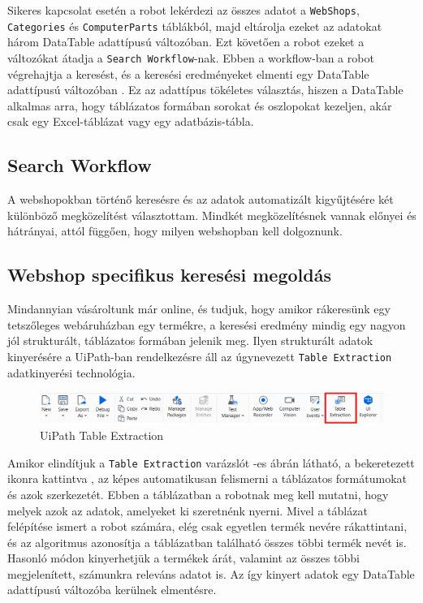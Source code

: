 \documentclass[
]{thesis-ekf}
\theoremstyle{definition}
\theoremstyle{remark}
\begin{document}
Sikeres kapcsolat esetén a robot lekérdezi az összes adatot a  \texttt{WebShops}, \texttt{Categories}  és \texttt{ComputerParts} táblákból, majd eltárolja ezeket az adatokat három DataTable adattípusú változóban. Ezt követően a robot ezeket a változókat átadja a \texttt{Search Workflow}-nak. Ebben a workflow-ban a robot végrehajtja a keresést, és a keresési eredményeket elmenti egy DataTable adattípusú változóban \cite{DataTable}. Ez az adattípus tökéletes választás, hiszen a DataTable alkalmas arra, hogy táblázatos formában sorokat és oszlopokat kezeljen, akár csak egy Excel-táblázat vagy egy adatbázis-tábla.

\subsection{Search Workflow}
A webshopokban történő keresésre és az adatok automatizált kigyűjtésére két különböző megközelítést választottam. Mindkét megközelítésnek vannak előnyei és hátrányai, attól függően, hogy milyen webshopban kell dolgoznunk.

\subsection*{Webshop specifikus keresési megoldás}
Mindannyian vásároltunk már online, és tudjuk, hogy amikor rákeresünk egy tetszőleges webáruházban egy termékre, a keresési eredmény mindig egy nagyon jól strukturált, táblázatos formában jelenik meg. Ilyen strukturált adatok kinyerésére a UiPath-ban rendelkezésre áll az úgynevezett \texttt{Table Extraction} \cite{TableExtraction} adatkinyerési technológia.

\begin{figure}[!ht]
	\centering
	\includegraphics[width=15.5cm]{tableExtraction2}
	\caption{ UiPath Table Extraction}
	\label{picture-TableExtraction}
\end{figure}


Amikor elindítjuk a \texttt{Table Extraction} varázslót -es ábrán látható, a bekeretezett ikonra kattintva , az képes automatikusan felismerni a táblázatos formátumokat és azok szerkezetét. Ebben a táblázatban a robotnak meg kell mutatni, hogy melyek azok az adatok, amelyeket ki szeretnénk nyerni. Mivel a táblázat felépítése ismert a robot számára, elég csak egyetlen termék nevére rákattintani, és az algoritmus azonosítja a táblázatban található összes többi termék nevét is. Hasonló módon kinyerhetjük a termékek árát, valamint az összes többi megjelenített, számunkra releváns adatot is. Az így kinyert adatok egy DataTable adattípusú változóba kerülnek elmentésre.
\end{document}
